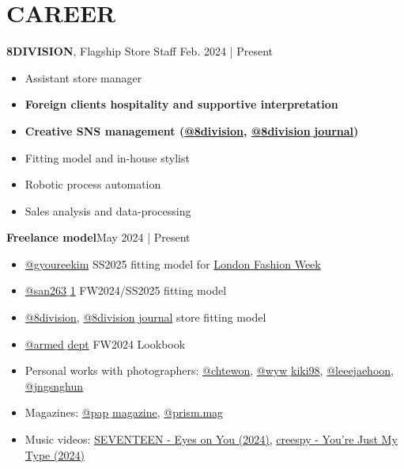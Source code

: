 \documentclass[a4paper,10pt]{extarticle}
\begin{document}
\section*{CAREER}
\noindent
\textbf{8DIVISION}, Flagship Store Staff \hfill Feb. 2024 | Present
\begin{itemize}
	\item Assistant store manager
	\item \textbf{Foreign clients hospitality and supportive interpretation}
	\item \textbf{Creative SNS management (\href{https://instagram.com/8division}{@8division}, \href{https://instagram.com/8division_journal}{@8division$\_$journal})}
	\item Fitting model and in-house stylist
	\item Robotic process automation
	\item Sales analysis and data-processing
\end{itemize}
\textbf{Freelance model}\hfill May 2024 | Present
\begin{itemize}
	\item \href{https://instagram.com/gyoureekim}{@gyoureekim} SS2025 fitting model for \href{https://instagram.com/londonfashionweek}{London Fashion Week}
	\item \href{https://instagram.com/san263_1}{@san263$\_$1} FW2024/SS2025 fitting model
	\item \href{https://instagram.com/8division}{@8division}, \href{https://instagram.com/8division_journal}{@8division$\_$journal} store fitting model
	\item \href{https://instagram.com/armed_dept}{@armed$\_$dept} FW2024 Lookbook
	\item Personal works with photographers: \href{https://instagram.com/chtewon}{@chtewon}, \href{https://instagram.com/wyw_kiki98}{@wyw$\_$kiki98}, \href{https://instagram.com/leeejaehoon}{@leeejaehoon}, \href{https://instagram.com/jngsnghun}{@jngsnghun}
	\item Magazines: \href{https://instagram.com/pap_magazine}{@pap$\_$magazine}, \href{https://instagram.com/prism.mag}{@prism.mag}
	\item Music videos: \href{https://www.youtube.com/watch?v=JjvX09nG2F0}{SEVENTEEN - Eyes on You (2024)}, \href{https://www.youtube.com/watch?v=9FoALFoanow}{creespy - You're Just My Type (2024)}
\end{itemize}
\end{document}
